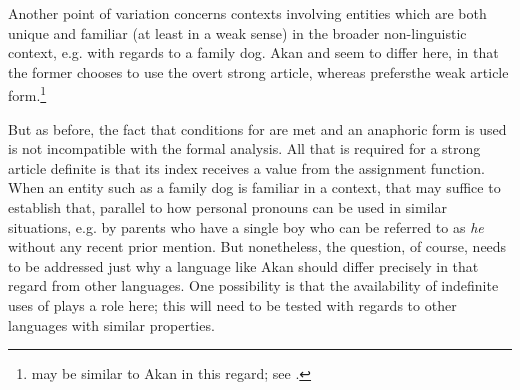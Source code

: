 \documentclass[output=paper
,modfonts
,nonflat]{langscibook}
\begin{document}
Another point of variation concerns contexts involving entities which
are both unique and familiar (at least in a weak sense) in the broader
non-linguistic context, e.g. with regards to a family dog. Akan and
 seem to differ here, in that the former chooses to use the
overt strong article, whereas  prefers\largerpage[1] the weak article form.\footnote{ may be similar to Akan in this regard; see \citet[189--190]{Wespel2008}.}



But as before, the fact that conditions for  are
met and an anaphoric
form is used is not
incompatible with the formal analysis. All that is required for a
strong article definite is that its index receives a value from the
assignment function. When an entity such as a family dog is familiar
in a context, that may suffice to establish that, parallel to how
personal pronouns can be used in similar situations, e.g. by parents
who have a single boy who can be referred to as \textit{he} without
any recent prior mention. But nonetheless, the question, of course,
needs to be addressed just why a language like Akan should differ
precisely in that regard from other languages. One possibility is that
the availability of indefinite uses of  plays a role
here; this will need to be tested with regards to other languages with
similar properties.
\end{document}
